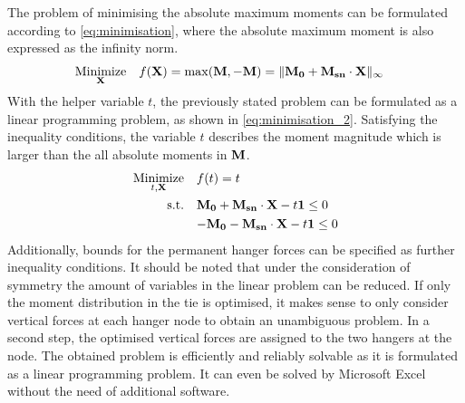 The problem of minimising the absolute maximum moments can be formulated according to \cref{eq:minimisation}, where the absolute maximum moment is also expressed as the infinity norm.
\begin{align}
    \underset{{\bf X}}{\text{Minimize}} \quad & f({\bf X}) = \max({\bf M}, -{\bf M}) = \|{\bf M_0} + {\bf M_{sn}} \cdot {\bf X}\|_{\infty} 
    \label{eq:minimisation}
\end{align}
With the helper variable $t$, the previously stated problem can be formulated as a linear programming problem, as shown in \cref{eq:minimisation_2}.
Satisfying the inequality conditions, the variable $t$ describes the moment magnitude which is larger than the all absolute moments in ${\bf M}$.
\begin{align}
    \underset{t, {\bf X}}{\text{Minimize}} \quad & f(t) = t \label{eq:minimisation_2} \\
    \text{s.t.} \quad & {\bf M_0} + {\bf M_{sn}} \cdot {\bf X} - t {\bf 1} \leq  0 \nonumber \\
    \quad & {-\bf M_0} - {\bf M_{sn}} \cdot {\bf X} - t {\bf 1} \leq 0 \nonumber
\end{align}
Additionally, bounds for the permanent hanger forces can be specified as further inequality conditions. It should be noted that under the consideration of symmetry the amount of variables in the linear problem can be reduced. If only the moment distribution in the tie is optimised, it makes sense to only consider vertical forces at each hanger node to obtain an unambiguous problem. In a second step, the optimised vertical forces are assigned to the two hangers at the node. The obtained problem is efficiently and reliably solvable as it is formulated as a linear programming problem. It can even be solved by Microsoft Excel without the need of additional software.

